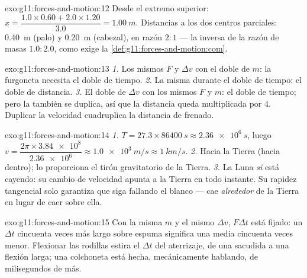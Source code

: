 \begin{solution}{exo:g11:forces-and-motion:12}
Desde el extremo superior:
$x = \dfrac{1.0 \times 0.60 + 2.0 \times 1.20}{3.0} = \qty{1.00}{m}$.
Distancias a los dos centros parciales: \qty{0.40}{m} (palo) y
\qty{0.20}{m} (cabezal), en razón $2 : 1$ --- la inversa de la razón de
masas $1.0 : 2.0$, como exige la
\cref{def:g11:forces-and-motion:com}.
\end{solution}

\begin{solution}{exo:g11:forces-and-motion:13}
\emph{1.} Los mismos $F$ y $\Delta v$ con el doble de $m$: la furgoneta
necesita el doble de tiempo. \emph{2.} La misma  durante
el doble de tiempo: el doble de distancia. \emph{3.} El doble de
$\Delta v$ con los mismos $F$ y $m$: el doble de tiempo; pero la
 también se duplica, así que la distancia queda
multiplicada por $4$. Duplicar la velocidad cuadruplica la distancia de
frenado.
\end{solution}

\begin{solution}{exo:g11:forces-and-motion:14}
\emph{1.} $T = 27.3 \times \qty{86400}{s} \approx \qty{2.36e6}{s}$,
luego $v = \dfrac{2\pi \times \num{3.84e8}}{\num{2.36e6}} \approx
\qty{1.0e3}{m/s} \approx \qty{1}{km/s}$. \emph{2.} Hacia la Tierra
(hacia dentro); lo proporciona el tirón gravitatorio de la Tierra.
\emph{3.} La Luna \emph{sí} está cayendo: su cambio de velocidad apunta
a la Tierra en todo instante. Su rapidez tangencial solo garantiza que
siga fallando el blanco --- cae \emph{alrededor} de la Tierra en lugar
de caer sobre ella.
\end{solution}

\begin{solution}{exo:g11:forces-and-motion:15}
Con la misma $m$ y el mismo $\Delta v$, $F\Delta t$ está fijado: un
$\Delta t$ cincuenta veces más largo sobre espuma significa una 
media cincuenta veces menor. Flexionar las rodillas estira el
$\Delta t$ del aterrizaje, de una sacudida a una flexión larga; una
colchoneta está hecha, mecánicamente hablando, de milisegundos de más.
\end{solution}

